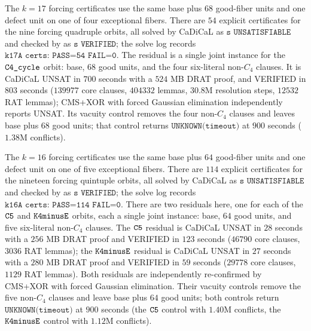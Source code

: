 \documentclass[11pt]{article}
\newcommand{\codepath}[1]{\texttt{\detokenize{#1}}}
\begin{document}
The \(k=17\) forcing certificates use the same base plus \(68\) good-fiber
units and one defect unit on one of four exceptional fibers.  There are \(54\)
explicit certificates for the nine forcing quadruple orbits, all solved by
CaDiCaL as \(\texttt{s UNSATISFIABLE}\) and checked by
\codepath{drat-trim} as \(\texttt{s VERIFIED}\); the solve log records
\(\texttt{k17A certs: PASS=54 FAIL=0}\).  The residual is a single joint
instance for the \(\codepath{C4_cycle}\) orbit: base, \(68\) good units, and
the four six-literal non-\(C_4\) clauses.  It is CaDiCaL UNSAT in \(700\)
seconds with a \(524\) MB DRAT proof, and \codepath{drat-trim} VERIFIED in
\(803\) seconds (\(139977\) core clauses, \(404332\) lemmas, \(30.8\)M
resolution steps, \(12532\) RAT lemmas); CMS+XOR
with forced Gaussian elimination independently reports UNSAT.  Its vacuity
control removes the four non-\(C_4\) clauses and leaves base plus \(68\) good
units; that control returns \(\texttt{UNKNOWN(timeout)}\) at \(900\) seconds
(\(1.38\)M conflicts).

The \(k=16\) forcing certificates use the same base plus \(64\) good-fiber
units and one defect unit on one of five exceptional fibers.  There are \(114\)
explicit certificates for the nineteen forcing quintuple orbits, all solved by
CaDiCaL as \(\texttt{s UNSATISFIABLE}\) and checked by
\codepath{drat-trim} as \(\texttt{s VERIFIED}\); the solve log records
\(\texttt{k16A certs: PASS=114 FAIL=0}\).  There are two residuals here, one for
each of the \(\codepath{C5}\) and \(\codepath{K4minusE}\) orbits, each a single
joint instance: base, \(64\) good units, and five six-literal non-\(C_4\)
clauses.  The \(\codepath{C5}\) residual is CaDiCaL UNSAT in \(28\) seconds with
a \(256\) MB DRAT proof and \codepath{drat-trim} VERIFIED in \(123\) seconds
(\(46790\) core clauses, \(3036\) RAT lemmas); the \(\codepath{K4minusE}\)
residual is CaDiCaL UNSAT in \(27\) seconds with a \(280\) MB DRAT proof and
\codepath{drat-trim} VERIFIED in \(59\) seconds (\(29778\) core clauses,
\(1129\) RAT lemmas).  Both residuals are independently re-confirmed by CMS+XOR
with forced Gaussian elimination.  Their vacuity controls remove the five
non-\(C_4\) clauses and leave base plus \(64\) good units; both controls return
\(\texttt{UNKNOWN(timeout)}\) at \(900\) seconds (the \(\codepath{C5}\) control
with \(1.40\)M conflicts, the \(\codepath{K4minusE}\) control with \(1.12\)M
conflicts).
\end{document}
